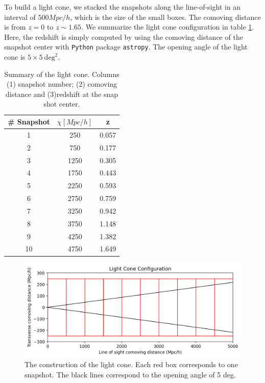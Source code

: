 \documentclass[fleqn,usenatbib]{mnras}
\begin{document}
To build a light cone, we stacked the snapshots along the line-of-sight in an interval of $500 Mpc/h$, which is the size of the small boxes. 
The comoving distance is from $z=0$ to $z\sim1.65$.
We summarize the light cone configuration in table \ref{tab:config}.
Here, the redshift is simply computed by using the comoving distance of the snapshot center with \texttt{Python} package \texttt{astropy}.
The opening angle of the light cone is $5\times5\ \mathrm{deg}^2$. 
\begin{table}
    \centering
    \caption{Summary of the light cone. Columns (1) snapshot number; (2) comoving distance and (3)redshift at the snap shot center.}
    \label{tab:config}
    \begin{tabular}{ccc}
        \# Snapshot & $\chi [Mpc/h]$ & z \\ \hline\hline
        1 & 250 & 0.057 \\
        2 & 750 & 0.177 \\
        3 & 1250 & 0.305 \\
        4 & 1750 & 0.443 \\
        5 & 2250 & 0.593 \\
        6 & 2750 & 0.759 \\
        7 & 3250 & 0.942 \\
        8 & 3750 & 1.148 \\
        9 & 4250 & 1.382 \\
        10 & 4750 & 1.649 \\ \hline
    \end{tabular}
\end{table}

\begin{figure}
    \centering
    \includegraphics[width=0.95\hsize]{img/config.png}
    \caption{The construction of the light cone. Each red box corresponds to one snapshot. 
    The black lines correspond to the opening angle of 5 deg.}
    \label{fig:config}
\end{figure}
\end{document}
